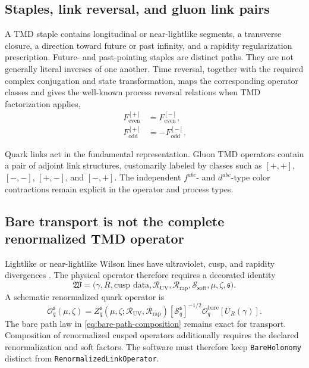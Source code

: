 \documentclass[11pt]{article}
\newcommand{\cO}{\mathcal O}
\newcommand{\cR}{\mathcal R}
\newcommand{\cS}{\mathcal S}
\begin{document}
\subsection{Staples, link reversal, and gluon link pairs}

A TMD staple contains longitudinal or near-lightlike segments, a transverse
closure, a direction toward future or past infinity, and a rapidity
regularization prescription.  Future- and past-pointing staples are distinct
paths.  They are not generally literal inverses of one another.  Time
reversal, together with the required complex conjugation and state
transformation, maps the corresponding operator classes and gives the
well-known process reversal relations when TMD factorization applies,
\begin{align}
 F_{\mathrm{even}}^{[+]}&=F_{\mathrm{even}}^{[-]},\\
 F_{\mathrm{odd}}^{[+]}&=-F_{\mathrm{odd}}^{[-]}.
\label{eq:t-even-odd-reversal}
\end{align}

Quark links act in the fundamental representation.  Gluon TMD operators
contain a pair of adjoint link structures, customarily labeled by classes
such as \([+,+]\), \([-,-]\), \([+,-]\), and \([-,+]\).  The independent
\(f^{abc}\)- and \(d^{abc}\)-type color contractions remain explicit in the
operator and process types.

\subsection{Bare transport is not the complete renormalized TMD operator}

Lightlike or near-lightlike Wilson lines have ultraviolet, cusp, and rapidity
divergences \cite{Collins2011,Echevarria2012}.  The physical operator therefore requires a decorated identity
\begin{equation}
 \mathfrak W=
 \bigl(
 \gamma,R,\text{cusp data},\cR_{\mathrm{UV}},\cR_{\mathrm{rap}},
 \cS_{\mathrm{soft}},\mu,\zeta,\mathfrak s
 \bigr).
\label{eq:decorated-wilson-operator}
\end{equation}
A schematic renormalized quark operator is
\begin{equation}
 \cO_{q}^{\mathfrak s}(\mu,\zeta)
 =Z_q^{\mathfrak s}(\mu,\zeta;\cR_{\mathrm{UV}},\cR_{\mathrm{rap}})
 \left[\cS_q^{\mathfrak s}\right]^{-1/2}
 \cO_{q}^{\mathrm{bare}}[U_R(\gamma)].
\label{eq:renormalized-tmd-operator}
\end{equation}
The bare path law in \cref{eq:bare-path-composition} remains exact for
transport.  Composition of renormalized cusped operators additionally
requires the declared renormalization and soft factors.  The software must
therefore keep \texttt{BareHolonomy} distinct from
\texttt{RenormalizedLinkOperator}.
\end{document}
